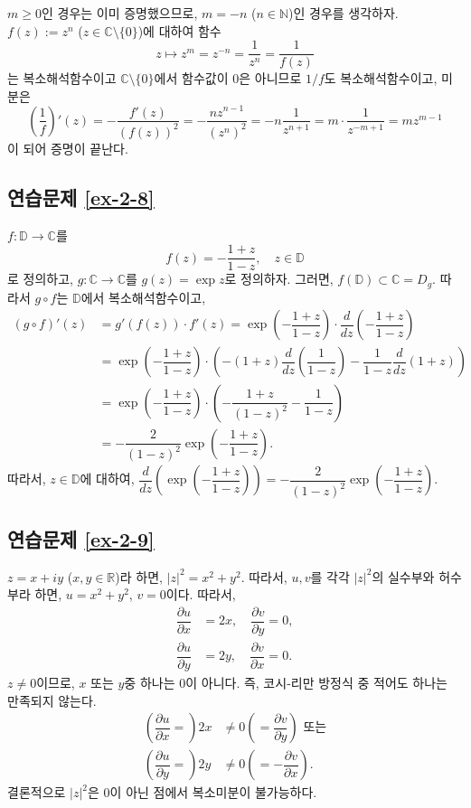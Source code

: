 $m\ge0$인 경우는 이미 증명했으므로, 
$m= -n$ ($n\in \mathbb N$)인 경우를 생각하자.
$f(z):=z^n$ ($z\in \mathbb C\setminus \{0\}$)에  대하여 함수
\[
z\mapsto z^m = z^{-n} = \dfrac1{z^n} = \dfrac1{f(z)}
\]
는 복소해석함수이고 $\mathbb C\setminus \{0\}$에서 함수값이
$0$은 아니므로
$1/f$도 복소해석함수이고, 미분은
\[
\left(\dfrac1f\right)'(z) = - \dfrac{f'(z)}{(f(z))^2} = - \dfrac{nz^{n-1}}{(z^n)^2}
= -n \dfrac1{z^{n+1}} = m \cdot \dfrac1{z^{-m+1}} = mz^{m-1}
\]
이 되어 증명이 끝난다.

\subsection*{연습문제 \ref{ex-2-8}}

$f: \mathbb D \to \mathbb C$를 
\[
f(z) = -\dfrac{1+z}{1-z},\quad z\in \mathbb D
\]
로 정의하고, $g: \mathbb C \to \mathbb C$를 $g(z)= \exp z$로 정의하자.
그러면, $f(\mathbb D) \subset \mathbb C = D_g$.
따라서 $g\circ f$는 $\mathbb D$에서 복소해석함수이고,
\begin{align*}
(g\circ f)'(z) &= g'(f(z))\cdot f'(z) 
= \exp\left( - \dfrac{1+z}{1-z}\right) \cdot \dfrac d{dz}\left( - \dfrac{1+z}{1-z}\right) \\
&= \exp\left( - \dfrac{1+z}{1-z}\right)\cdot \left(
-(1+z)\dfrac d{dz} \left(\dfrac1{1-z}\right) - \dfrac1{1-z}\dfrac d {dz}(1+z)\right) \\
&= \exp\left( - \dfrac{1+z}{1-z}\right) \cdot \left(
-\dfrac{1+z}{(1-z)^2} - \dfrac1{1-z} \right) \\
&= - \dfrac2{(1-z)^2} \exp\left( - \dfrac{1+z}{1-z}\right).
\end{align*}
따라서, $z\in\mathbb D$에 대하여,
$\dfrac d{dz} \left( \exp\left( - \dfrac{1+z}{1-z}\right) \right)
=  - \dfrac2{(1-z)^2} \exp\left( - \dfrac{1+z}{1-z}\right)$.

\subsection*{연습문제 \ref{ex-2-9}}

$z = x+iy$ ($x,y\in\mathbb R$)라 하면,
$|z|^2 = x^2+y^2$.
따라서, $u, v$를 각각 $|z|^2$의 실수부와 허수부라 하면,
$u=x^2+y^2$, $v=0$이다. 따라서,
\begin{align*}
\dfrac{\partial u}{\partial x} &=2x, \quad \dfrac{\partial v}{\partial y} = 0, \\
\dfrac{\partial u}{\partial y} &=2y, \quad \dfrac{\partial v}{\partial x} = 0.
\end{align*}
$z\ne0$이므로, $x$ 또는 $y$중 하나는 $0$이 아니다.
즉, 코시-리만 방정식 중 적어도 하나는 만족되지 않는다.
\begin{align*}
\left( \dfrac{\partial u}{\partial x} = \right) 2x &\ne 0 
\left( = \dfrac{\partial v}{\partial y} \right) \text{ 또는} \\
\left( \dfrac{\partial u}{\partial y} = \right) 2y &\ne 0 
\left( = - \dfrac{\partial v}{\partial x} \right).
\end{align*}
결론적으로 $|z|^2$은 $0$이 아닌 점에서 복소미분이 불가능하다.

